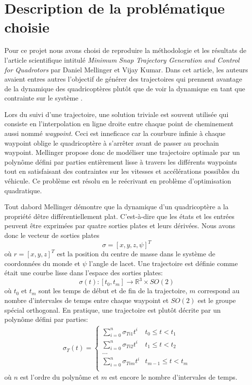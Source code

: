 
\section{Description de la problématique choisie}
Pour ce projet nous avons choisi de reproduire la méthodologie et les résultats de l'article scientifique intitulé \textit{Minimum Snap Trajectory Generation and Control for Quadrotors} par Daniel Mellinger et Vijay Kumar. Dans cet article, les auteurs avaient entres autres l'objectif de générer des trajectoires qui prennent avantage de la dynamique des quadricoptères plutôt que de voir la dynamique en tant que contrainte sur le système \cite{Mellinger2011}. 

Lors du suivi d'une trajectoire, une solution triviale est souvent utilisée qui consiste en l'interpolation en ligne droite entre chaque point de cheminement aussi nommé \textit{waypoint}. Ceci est inneficace car la courbure infinie à chaque waypoint oblige le quadricoptère à s'arrêter avant de passer au prochain waypoint. Mellinger propose donc de modéliser une trajectoire optimale par un polynôme défini par parties entièrement lisse à travers les différents waypoints tout en satisfaisant des contraintes sur les vitesses et accélérations possibles du véhicule. Ce problème est résolu en le reécrivant en problème d'optimisation quadratique.

Tout dabord Mellinger démontre que la dynamique d'un quadricoptère a la propriété dêtre différentiellement plat. C'est-à-dire que les états et les entrées peuvent être exprimées par quatre sorties plates et leurs dérivées. Nous avons donc le vecteur de sorties plates
$$\sigma = [x, y, z, \psi]^T$$
où $r = [x, y, z]^T$ est la position du centre de masse dans le système de coordonnées du monde et $\psi$ l'angle de lacet. Une trajectoire est définie comme était une courbe lisse dans l'espace des sorties plates:
$$ \sigma(t) : [t_0, t_m] \rightarrow \mathbb{R}^3 \times SO(2)$$ 
où $t_0$ et $t_m$ sont les temps de début et de fin de la trajectoire, $m$ correspond au nombre d'intervales de temps entre chaque waypoint et $SO(2)$ est le groupe spécial orthogonal. En pratique, une trajectoire est plutôt décrite par un polynôme défini par parties:
\begin{align}\label{eq:polynomial}
\sigma_T(t) =
\left\{
	\begin{array}{ll}
		\sum_{i=0}^n \sigma_{Ti1} t^i  & t_0 \leq t < t_1 \\
		\sum_{i=0}^n \sigma_{Ti2} t^i  & t_1 \leq t < t_2 \\
		... \\
		\sum_{i=0}^n \sigma_{Tim} t^i  & t_{m-1} \leq t < t_m \\
	\end{array}
\right.
\end{align}
où $n$ est l'ordre du polynôme et $m$ est encore le nombre d'intervales de temps.

